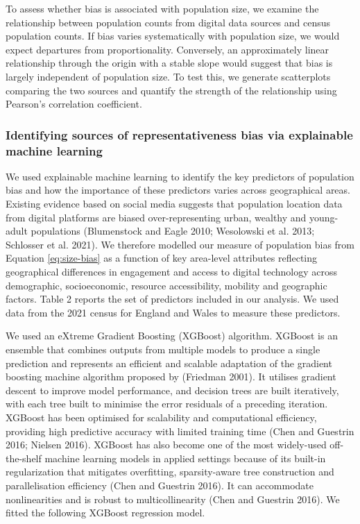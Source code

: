 \documentclass{article}
\begin{document}
To assess whether bias is associated with population size, we
examine the relationship between population counts from digital data
sources and census population counts. If bias varies systematically with
population size, we would expect departures from proportionality.
Conversely, an approximately linear relationship through the origin with
a stable slope would suggest that bias is largely independent of
population size. To test this, we generate scatterplots comparing the
two sources and quantify the strength of the relationship using
Pearson's correlation coefficient.

\subsubsection{Identifying sources of representativeness bias via explainable machine learning}\label{sec-eml}

We used explainable machine learning to identify the key predictors of
population bias and how the importance of these predictors varies across
geographical areas. Existing evidence based on social media suggests
that population location data from digital platforms are biased
over-representing urban, wealthy and young-adult populations (Blumenstock and Eagle 2010; Wesolowski et al. 2013; Schlosser et al. 2021).
We therefore modelled our measure of population bias from
Equation \ref{eq:size-bias} as a function of key area-level attributes
reflecting geographical differences in engagement and access to digital
technology across demographic, socioeconomic, resource accessibility,
mobility and geographic factors. Table 2 reports the set of predictors
included in our analysis. We used data from the 2021 census for England
and Wales to measure these predictors.

We used an eXtreme Gradient Boosting (XGBoost) algorithm. XGBoost is an
ensemble that combines outputs from multiple models to produce a single
prediction and represents an efficient and scalable adaptation of the
gradient boosting machine algorithm proposed by (Friedman 2001). It
utilises gradient descent to improve model performance, and decision
trees are built iteratively, with each tree built to minimise the error
residuals of a preceding iteration. XGBoost has been optimised for
scalability and computational efficiency, providing high predictive
accuracy with limited training time (Chen and Guestrin 2016; Nielsen 2016).
XGBoost has also become one of the most widely-used off-the-shelf
machine learning models in applied settings because of its built-in
regularization that mitigates overfitting, sparsity-aware tree
construction and parallelisation efficiency (Chen and Guestrin 2016). It can
accommodate nonlinearities and is robust to multicollinearity
(Chen and Guestrin 2016). We fitted the following XGBoost regression model.
\end{document}
